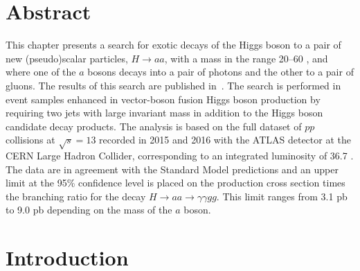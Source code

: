 \section{Abstract}
This chapter presents a search for exotic decays of the Higgs boson to a pair of new (pseudo)scalar
particles, $H\to aa$, with a mass in the range 20--60 \GeV{}, and where one of the $a$ bosons decays into a pair of photons and the other to a pair of gluons.
The results of this search are published in~\cite{Aaboud:2018gmx}.
The search is performed in event samples enhanced in vector-boson fusion Higgs boson production
by requiring two jets with large invariant mass in addition to the Higgs boson candidate decay products.
The analysis is based on the full dataset of $pp$ collisions at $\sqrt{s}= 13$ \TeV{} recorded in 2015 and 2016 with the ATLAS detector at the CERN Large Hadron Collider,
corresponding to an integrated luminosity of 36.7 \ifb.
The data are in agreement with the Standard Model predictions and an upper limit at the 95\% confidence level is placed on the production cross section times the
branching ratio for the decay $H\to aa\to \gamma\gamma gg$.
This limit ranges from 3.1 pb to 9.0 pb depending on the mass of the $a$ boson.


\section{Introduction}

